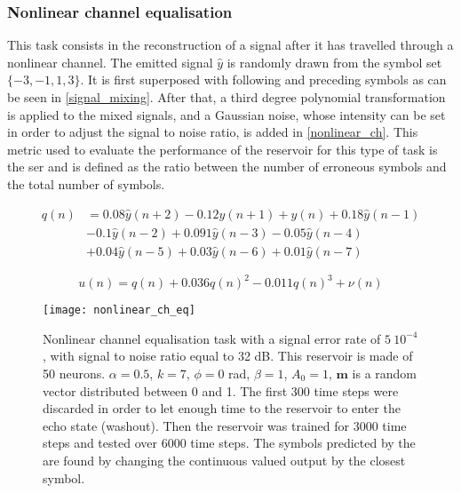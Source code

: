 
\subsubsection{Nonlinear channel equalisation}

This task consists in the reconstruction of a signal after it has travelled through a nonlinear channel. The emitted signal $\hat{y}$ is randomly drawn from the symbol set $\{-3,-1,1,3\}$. It is first superposed with following and preceding symbols as can be seen in \eqref{signal_mixing}. After that, a third degree polynomial transformation is applied to the mixed signals, and a Gaussian noise, whose intensity can be set in order to adjust the signal to noise ratio, is added in \eqref{nonlinear_ch}. This metric used to evaluate the performance of the reservoir for this type of task is the \gls{ser} and is defined as the ratio between the number of erroneous symbols and the total number of symbols.

\begin{align}
	q(n) &= 0.08\hat{y}(n+2)-0.12\hat{y}(n+1)+\hat{y}(n)+0.18\hat{y}(n-1) \nonumber\\
	&-0.1\hat{y}(n-2)+0.091\hat{y}(n-3)-0.05\hat{y}(n-4) \nonumber\\
	&+0.04\hat{y}(n-5)+0.03\hat{y}(n-6)+0.01\hat{y}(n-7) \label{signal_mixing}
\end{align}

\begin{equation}
	u(n)=q(n)+0.036q(n)^2-0.011q(n)^3+\nu(n)
	\label{nonlinear_ch}
\end{equation}

\begin{figure}[h]
	\centering
	\texttt{[image: nonlinear\_ch\_eq]}
	\caption{Nonlinear channel equalisation task with a signal error rate of $5~10^{-4}$, with signal to noise ratio equal to 32 dB. This reservoir is made of 50 neurons. $\alpha=0.5$, $k=7$, $\phi=0$ rad, $\beta=1$, $A_0=1$, $\mathbf{m}$ is a random vector distributed between 0 and 1. The first 300 time steps were discarded in order to let enough time to the reservoir to enter the echo state (washout). Then the reservoir was trained for 3000 time steps and tested over 6000 time steps. The symbols predicted by the \rcer are found by changing the continuous valued output by the closest symbol.}
\end{figure}
